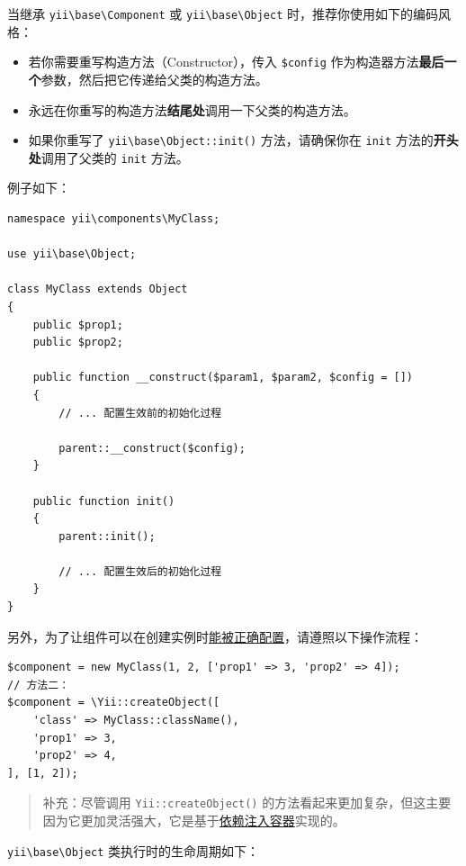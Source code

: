 当继承 \texttt{yii{\allowbreak{}\textbackslash}base{\allowbreak{}\textbackslash}Component} 或 \texttt{yii{\allowbreak{}\textbackslash}base{\allowbreak{}\textbackslash}Object} 时，推荐你使用如下的编码风格：

\begin{itemize}
\item 若你需要重写构造方法（Constructor），传入 \lstinline|$config| 作为构造器方法\textbf{最后一个}参数，然后把它传递给父类的构造方法。
\item 永远在你重写的构造方法\textbf{结尾处}调用一下父类的构造方法。
\item 如果你重写了 \texttt{yii{\allowbreak{}\textbackslash}base{\allowbreak{}\textbackslash}Object\allowbreak{}::\allowbreak{}init()} 方法，请确保你在 \lstinline|init| 方法的\textbf{开头处}调用了父类的 \lstinline|init| 方法。
\end{itemize}
例子如下：

\lstset{language=php}\begin{lstlisting}
namespace yii\components\MyClass;

use yii\base\Object;

class MyClass extends Object
{
    public $prop1;
    public $prop2;

    public function __construct($param1, $param2, $config = [])
    {
        // ... 配置生效前的初始化过程

        parent::__construct($config);
    }

    public function init()
    {
        parent::init();

        // ... 配置生效后的初始化过程
    }
}
\end{lstlisting}
另外，为了让组件可以在创建实例时\hyperref[concept-configurations.md]{能被正确配置}，请遵照以下操作流程：

\lstset{language=php}\begin{lstlisting}
$component = new MyClass(1, 2, ['prop1' => 3, 'prop2' => 4]);
// 方法二：
$component = \Yii::createObject([
    'class' => MyClass::className(),
    'prop1' => 3,
    'prop2' => 4,
], [1, 2]);
\end{lstlisting}
\begin{quote}补充：尽管调用 \texttt{Yii\allowbreak{}::\allowbreak{}createObject()} 的方法看起来更加复杂，但这主要因为它更加灵活强大，它是基于\hyperref[concept-di-container.md]{依赖注入容器}实现的。

\end{quote}
\texttt{yii{\allowbreak{}\textbackslash}base{\allowbreak{}\textbackslash}Object} 类执行时的生命周期如下：

